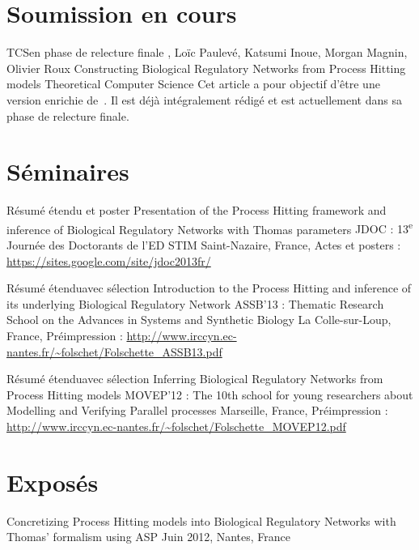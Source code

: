 \section{Soumission en cours}
\label{sec:encours}

\publi
{TCS}{en phase de relecture finale}
{, Loïc Paulevé, Katsumi Inoue, Morgan Magnin, Olivier Roux}
{Constructing Biological Regulatory Networks from Process Hitting models}
{}{Theoretical Computer Science}{}
{Cet article a pour objectif d'être une version enrichie de~\cite{FPIMR12-CMSB}.
Il est déjà intégralement rédigé et est actuellement dans sa phase de relecture finale.}



\section{Séminaires}

\publi
{Résumé étendu et poster}{}
{}
{Presentation of the Process Hitting framework and inference of Biological Regulatory Networks with Thomas parameters}
{}{JDOC : 13\textsuperscript{e} Journée des Doctorants de l'ED STIM}
{Saint-Nazaire, France, }
{Actes et posters : \url{https://sites.google.com/site/jdoc2013fr/}}

\publi
{Résumé étendu}{avec sélection}
{}
{Introduction to the Process Hitting and inference of its underlying Biological Regulatory Network}
{}{ASSB'13 : Thematic Research School on the Advances in Systems and Synthetic Biology}
{La Colle-sur-Loup, France, }
{Préimpression : \url{http://www.irccyn.ec-nantes.fr/~folschet/Folschette_ASSB13.pdf}}

\publi
{Résumé étendu}{avec sélection}
{}
{Inferring Biological Regulatory Networks from Process Hitting models}
{}{MOVEP'12 : The 10th school for young researchers about Modelling and Verifying Parallel processes}
{Marseille, France, }
{Préimpression : \url{http://www.irccyn.ec-nantes.fr/~folschet/Folschette_MOVEP12.pdf}}



\section{Exposés}

{Concretizing Process Hitting models into Biological Regulatory Networks with Thomas' formalism using ASP}
{Juin 2012, Nantes, France}

